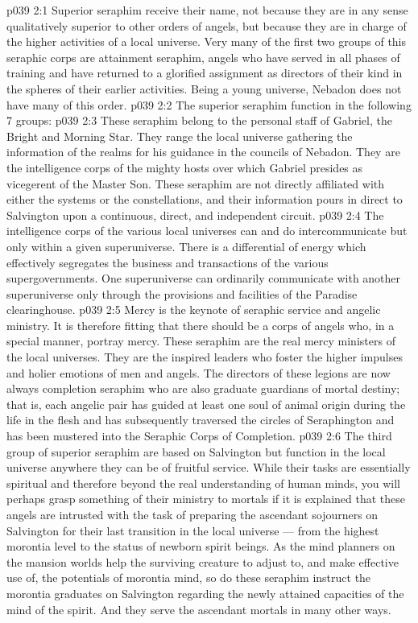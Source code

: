 \vs p039 2:1 Superior seraphim receive their name, not because they are in any sense qualitatively superior to other orders of angels, but because they are in charge of the higher activities of a local universe. Very many of the first two groups of this seraphic corps are attainment seraphim, angels who have served in all phases of training and have returned to a glorified assignment as directors of their kind in the spheres of their earlier activities. Being a young universe, Nebadon does not have many of this order.
\vs p039 2:2 The superior seraphim function in the following 7 groups:
\vs p039 2:3 \bibnobreakspace {} These seraphim belong to the personal staff of Gabriel, the Bright and Morning Star. They range the local universe gathering the information of the realms for his guidance in the councils of Nebadon. They are the intelligence corps of the mighty hosts over which Gabriel presides as vicegerent of the Master Son. These seraphim are not directly affiliated with either the systems or the constellations, and their information pours in direct to Salvington upon a continuous, direct, and independent circuit.
\vs p039 2:4 The intelligence corps of the various local universes can and do intercommunicate but only within a given superuniverse. There is a differential of energy which effectively segregates the business and transactions of the various supergovernments. One superuniverse can ordinarily communicate with another superuniverse only through the provisions and facilities of the Paradise clearinghouse.
\vs p039 2:5 \bibnobreakspace {} Mercy is the keynote of seraphic service and angelic ministry. It is therefore fitting that there should be a corps of angels who, in a special manner, portray mercy. These seraphim are the real mercy ministers of the local universes. They are the inspired leaders who foster the higher impulses and holier emotions of men and angels. The directors of these legions are now always completion seraphim who are also graduate guardians of mortal destiny; that is, each angelic pair has guided at least one soul of animal origin during the life in the flesh and has subsequently traversed the circles of Seraphington and has been mustered into the Seraphic Corps of Completion.
\vs p039 2:6 \bibnobreakspace {} The third group of superior seraphim are based on Salvington but function in the local universe anywhere they can be of fruitful service. While their tasks are essentially spiritual and therefore beyond the real understanding of human minds, you will perhaps grasp something of their ministry to mortals if it is explained that these angels are intrusted with the task of preparing the ascendant sojourners on Salvington for their last transition in the local universe --- from the highest morontia level to the status of newborn spirit beings. As the mind planners on the mansion worlds help the surviving creature to adjust to, and make effective use of, the potentials of morontia mind, so do these seraphim instruct the morontia graduates on Salvington regarding the newly attained capacities of the mind of the spirit. And they serve the ascendant mortals in many other ways.

